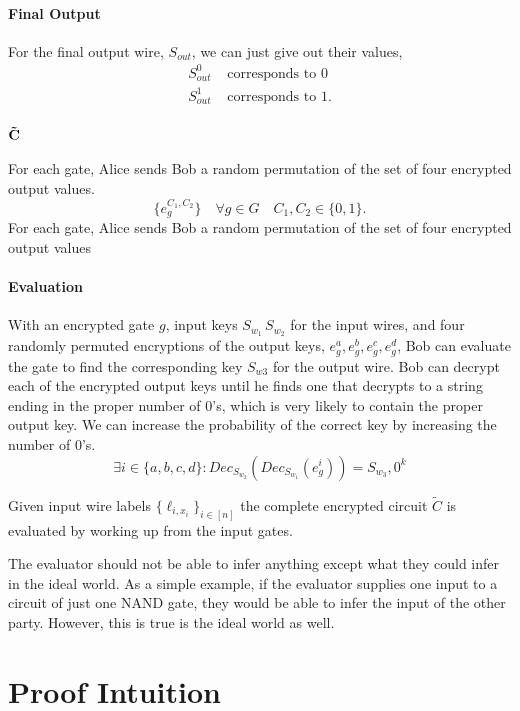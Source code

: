 \documentclass[11pt]{article}
\newcommand{\Dec}{\ensuremath{Dec}\xspace}
\begin{document}
\paragraph{Final Output}
For the final output wire, $S_{out}$, we can just give out their values,
\begin{align*}
S_{out}^0 &\text{ corresponds to 0}\\
S_{out}^1 &\text{ corresponds to 1.}
\end{align*}

\paragraph{$\bold{\tilde{C}}$}
For each gate, Alice sends Bob a random permutation of the set of four encrypted output values.
\[
\{e_g^{C_1, C_2} \} \quad \forall g \in G \quad C_1, C_2 \in \{0,1\}.
\]
For each gate, Alice sends Bob a random permutation of the set of four encrypted output values

\paragraph{Evaluation}
With an encrypted gate $g$,
input keys $S_{w_1} \, S_{w_2}$ for the input wires,
and four randomly permuted encryptions of the output keys, $e_g^{a}, e_g^{b}, e_g^{c}, e_g^{d}$,
Bob can evaluate the gate to find the corresponding key $S_{w3}$ for the output wire.
Bob can decrypt each of the encrypted output keys until he finds one that decrypts 
to a string ending in the proper number of $0$'s, which is very likely to contain the proper output key.
We can increase the probability of the correct key by increasing the number of $0$'s. 
\[
\exists  i \in \{a, b, c, d\} : \Dec_{S_{w_2}} ( \Dec_{S_{w_1}} ( e_g^{i} ))  = S_{w_3}, 0^k
\]

Given input wire labels 
$\{ \ell_{i, x_i} \}_{i \in [n]}$
the complete encrypted circuit $\tilde{C}$ is evaluated by working up from the input gates. 




The evaluator should not be able to infer anything except what they could infer in the ideal world.
As a simple example, if the evaluator supplies one input to a circuit of just one NAND gate,
 they would be able to infer the input of the other party. However, this is true is the ideal world as well.

\section{Proof Intuition}
\end{document}
